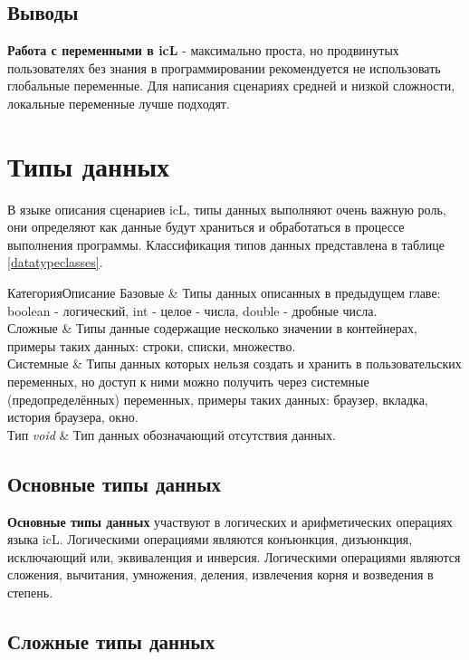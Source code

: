 \documentclass[a4paper, 14pt, russian]{extarticle}
\begin{document}
\subsection{Выводы}

	{\bf Работа с переменными в icL} - максимально проста, но продвинутых пользователях без знания в программировании рекомендуется не использовать глобальные переменные. Для написания сценариях средней и низкой сложности, локальные переменные лучше подходят. 

\section{Типы данных}

	В языке описания сценариев icL, типы данных выполняют очень важную роль, они определяют как данные будут храниться и обработаться в процессе выполнения программы. Классификация типов данных представлена в таблице \ref{datatypeclasses}.
	
	{Категория}{Описание}
	{
	Базовые & Типы данных описанных в предыдущем главе: boolean - логический, int - целое - числа, double - дробные числа. \\ \hline
	Сложные & Типы данные содержащие несколько значении в контейнерах, примеры таких данных: строки, списки, множество. \\ \hline
	Системные & Типы данных которых нельзя создать и хранить в пользовательских переменных, но доступ к ними можно получить через системные (предопределённых) переменных, примеры таких данных: браузер, вкладка, история браузера, окно. \\ \hline
	Тип \textit{void} & Тип данных обозначающий отсутствия данных.
	}
	
\subsection{Основные типы данных}

	{\bf Основные типы данных} участвуют в логических и арифметических операциях языка icL. Логическими операциями являются конъюнкция, дизъюнкция, исключающий или, эквиваленция и инверсия. Логическими операциями являются сложения, вычитания, умножения, деления, извлечения корня и возведения в степень.
	
\subsection{Сложные типы данных}
\end{document}
